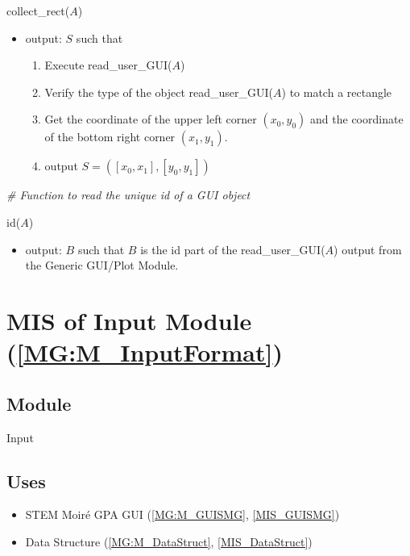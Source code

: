 \documentclass[12pt, titlepage]{article}
\begin{document}
\noindent collect{\_}rect($A$)
\begin{itemize}
\item output: $S$ such that
	\begin{enumerate}
	\item Execute read{\_}user{\_}GUI($A$)
	\item Verify the type of the object read{\_}user{\_}GUI($A$) to match a 
rectangle
	\item Get the coordinate of the upper left corner $(x_0,y_0)$ and the 
coordinate of the bottom right corner $(x_1,y_1)$. 
	\item output $S=([x_0,x_1],[y_0,y_1])$
	\end{enumerate} 
\end{itemize}
\bigskip

\noindent\textit{{\#} Function to read the unique id of a GUI object} \medskip

\noindent id($A$)
\begin{itemize}
\item output: $B$ such that $B$ is the id part of the read{\_}user{\_}GUI($A$) 
output from the Generic GUI/Plot Module.
\end{itemize}
\bigskip

\section{MIS of Input Module (\texorpdfstring{\cref{MG:M_InputFormat}}))} 
\label{MIS_Input}


\subsection{Module}
Input
\subsection{Uses}
\begin{itemize}
\item STEM Moir{\'e} GPA GUI (\cref{MG:M_GUISMG}, \cref{MIS_GUISMG})
\item Data Structure (\cref{MG:M_DataStruct}, \cref{MIS_DataStruct})
\end{itemize}
\end{document}
